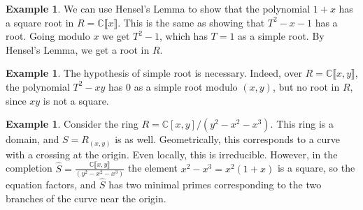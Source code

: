 \documentclass{amsart}[12pt]
\newcommand{\C}{\mathbb{C}}
\numberwithin{equation}{section}
\theoremstyle{plain} %
\theoremstyle{definition}
\newtheorem{ex}[equation]{Example}
\theoremstyle{remark}
\begin{document}
\begin{ex} We can use Hensel's Lemma to show that the polynomial $1+x$ has a square root in $R=\C\llbracket x \rrbracket$. This is the same as showing that $T^2 - x- 1$ has a root. Going modulo $x$ we get $T^2 -1$, which has $T=1$ as a simple root. By Hensel's Lemma, we get a root in $R$.
\end{ex}

\begin{ex} The hypothesis of simple root is necessary. Indeed, over $R=\C\llbracket x,y \rrbracket$, the polynomial $T^2-xy$ has $0$ as a simple root modulo $(x,y)$, but no root in $R$, since $xy$ is not a square.
\end{ex}

\begin{ex} Consider the ring $R=\C[x,y]/(y^2 - x^2 - x^3)$. This ring is a domain, and $S=R_{(x,y)}$ is as well. Geometrically, this corresponds to a curve with a crossing at the origin. Even locally, this is irreducible. However, in the completion $\hat{S} = \frac{ \C \llbracket x,y \rrbracket } {(y^2 - x^2 - x^3)}$ the element $x^2 - x^3 = x^2 (1+x)$ is a square, so the equation factors, and $\hat{S} $ has two minimal primes corresponding to the two branches of the curve near the origin.
\end{ex}



\end{document}

